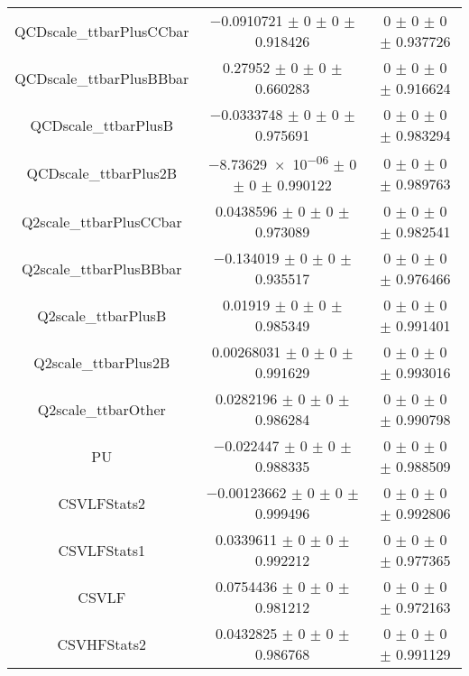 \begin{table}
\begin{tabular}{ccc}
QCDscale\_ttbarPlusCCbar 	& \num{-0.0910721} $\pm$ \num{0} $\pm$ \num{0} $\pm$ \num{0.918426} 	& \num{0} $\pm$ \num{0} $\pm$ \num{0} $\pm$ \num{0.937726}\\
QCDscale\_ttbarPlusBBbar 	& \num{0.27952} $\pm$ \num{0} $\pm$ \num{0} $\pm$ \num{0.660283} 	& \num{0} $\pm$ \num{0} $\pm$ \num{0} $\pm$ \num{0.916624}\\
QCDscale\_ttbarPlusB 	& \num{-0.0333748} $\pm$ \num{0} $\pm$ \num{0} $\pm$ \num{0.975691} 	& \num{0} $\pm$ \num{0} $\pm$ \num{0} $\pm$ \num{0.983294}\\
QCDscale\_ttbarPlus2B 	& \num{-8.73629e-06} $\pm$ \num{0} $\pm$ \num{0} $\pm$ \num{0.990122} 	& \num{0} $\pm$ \num{0} $\pm$ \num{0} $\pm$ \num{0.989763}\\
Q2scale\_ttbarPlusCCbar 	& \num{0.0438596} $\pm$ \num{0} $\pm$ \num{0} $\pm$ \num{0.973089} 	& \num{0} $\pm$ \num{0} $\pm$ \num{0} $\pm$ \num{0.982541}\\
Q2scale\_ttbarPlusBBbar 	& \num{-0.134019} $\pm$ \num{0} $\pm$ \num{0} $\pm$ \num{0.935517} 	& \num{0} $\pm$ \num{0} $\pm$ \num{0} $\pm$ \num{0.976466}\\
Q2scale\_ttbarPlusB 	& \num{0.01919} $\pm$ \num{0} $\pm$ \num{0} $\pm$ \num{0.985349} 	& \num{0} $\pm$ \num{0} $\pm$ \num{0} $\pm$ \num{0.991401}\\
Q2scale\_ttbarPlus2B 	& \num{0.00268031} $\pm$ \num{0} $\pm$ \num{0} $\pm$ \num{0.991629} 	& \num{0} $\pm$ \num{0} $\pm$ \num{0} $\pm$ \num{0.993016}\\
Q2scale\_ttbarOther 	& \num{0.0282196} $\pm$ \num{0} $\pm$ \num{0} $\pm$ \num{0.986284} 	& \num{0} $\pm$ \num{0} $\pm$ \num{0} $\pm$ \num{0.990798}\\
PU 	& \num{-0.022447} $\pm$ \num{0} $\pm$ \num{0} $\pm$ \num{0.988335} 	& \num{0} $\pm$ \num{0} $\pm$ \num{0} $\pm$ \num{0.988509}\\
CSVLFStats2 	& \num{-0.00123662} $\pm$ \num{0} $\pm$ \num{0} $\pm$ \num{0.999496} 	& \num{0} $\pm$ \num{0} $\pm$ \num{0} $\pm$ \num{0.992806}\\
CSVLFStats1 	& \num{0.0339611} $\pm$ \num{0} $\pm$ \num{0} $\pm$ \num{0.992212} 	& \num{0} $\pm$ \num{0} $\pm$ \num{0} $\pm$ \num{0.977365}\\
CSVLF 	& \num{0.0754436} $\pm$ \num{0} $\pm$ \num{0} $\pm$ \num{0.981212} 	& \num{0} $\pm$ \num{0} $\pm$ \num{0} $\pm$ \num{0.972163}\\
CSVHFStats2 	& \num{0.0432825} $\pm$ \num{0} $\pm$ \num{0} $\pm$ \num{0.986768} 	& \num{0} $\pm$ \num{0} $\pm$ \num{0} $\pm$ \num{0.991129}\\

\end{tabular}
\end{table}
